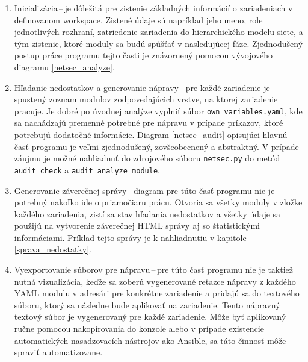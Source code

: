 \begin{enumerate}
	\item Inicializácia\,--\,je dôležitá pre zistenie základných informácií o zariadeniach v definovanom workspace. Zistené údaje sú napríklad jeho meno, role jednotlivých rozhraní, zatriedenie zariadenia do hierarchického modelu siete, a tým zistenie, ktoré moduly sa budú spúšťať v nasledujúcej fáze. Zjednodušený postup práce programu tejto časti je znázornený pomocou vývojového diagramu \ref{netsec_analyze}.
	\item Hľadanie nedostatkov a generovanie nápravy\,--\,pre každé zariadenie je spustený zoznam modulov zodpovedajúcich vrstve, na ktorej zariadenie pracuje. Je dobré po úvodnej analýze vyplniť súbor \texttt{own\_variables.yaml}, kde sa nachádzajú premenné potrebné pre nápravu v prípade príkazov, ktoré potrebujú dodatočné informácie. Diagram \ref{netsec_audit} opisujúci hlavnú časť programu je veľmi zjednodušený, zovšeobecnený a abstraktný. V prípade záujmu je možné nahliadnuť do zdrojového súboru \texttt{netsec.py} do metód \texttt{audit\_check} a \texttt{audit\_analyze\_module}.
	\item Generovanie záverečnej správy\,--\,diagram pre túto časť programu nie je potrebný nakoľko ide o priamočiaru prácu. Otvoria sa všetky moduly v zložke každého zariadenia, zistí sa stav hľadania nedostatkov a všetky údaje sa použijú na vytvorenie záverečnej HTML správy aj so štatistickými informáciami. Príklad tejto správy je k nahliadnutiu v kapitole \ref{sprava_nedostatky}.
	\item Vyexportovanie súborov pre nápravu\,--\,pre túto časť programu nie je taktiež nutná vizualizácia, keďže sa zoberú vygenerované reťazce nápravy z každého YAML modulu v adresári pre konkrétne zariadenie a pridajú sa do textového súboru, ktorý sa následne bude aplikovať na zariadenie. Tento nápravný textový súbor je vygenerovaný pre každé zariadenie. Môže byť aplikovaný ručne pomocou nakopírovania do konzole alebo v prípade existencie automatických nasadzovacích nástrojov ako Ansible, sa táto činnosť môže spraviť automatizovane.
\end{enumerate}

